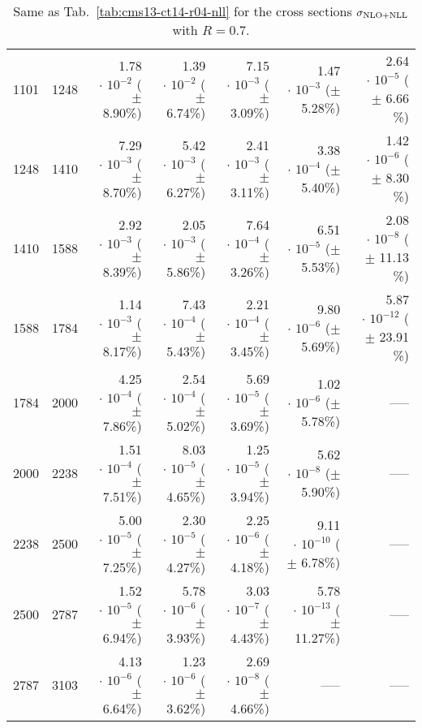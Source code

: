 \begin{table}[h!]
\begin{center}
\begin{tabular}{|r|r|r|r|r|r|r|}
1101 & 1248 & 1.78$\,\cdot\, 10^{-2}$  ($\pm\!\!$  8.90\%) & 1.39$\,\cdot\, 10^{-2}$  ($\pm\!\!$  6.74\%) & 7.15$\,\cdot\, 10^{-3}$  ($\pm\!\!$  3.09\%) & 1.47$\,\cdot\, 10^{-3}$  ($\pm\!\!$  5.28\%) & 2.64$\,\cdot\, 10^{-5}$  ($\pm\!\!$  6.66 \%)\\
1248 & 1410 & 7.29$\,\cdot\, 10^{-3}$  ($\pm\!\!$  8.70\%) & 5.42$\,\cdot\, 10^{-3}$  ($\pm\!\!$  6.27\%) & 2.41$\,\cdot\, 10^{-3}$  ($\pm\!\!$  3.11\%) & 3.38$\,\cdot\, 10^{-4}$  ($\pm\!\!$  5.40\%) & 1.42$\,\cdot\, 10^{-6}$  ($\pm\!\!$  8.30 \%)\\
1410 & 1588 & 2.92$\,\cdot\, 10^{-3}$  ($\pm\!\!$  8.39\%) & 2.05$\,\cdot\, 10^{-3}$  ($\pm\!\!$  5.86\%) & 7.64$\,\cdot\, 10^{-4}$  ($\pm\!\!$  3.26\%) & 6.51$\,\cdot\, 10^{-5}$  ($\pm\!\!$  5.53\%) & 2.08$\,\cdot\, 10^{-8}$  ($\pm\!\!$ 11.13 \%)\\
1588 & 1784 & 1.14$\,\cdot\, 10^{-3}$  ($\pm\!\!$  8.17\%) & 7.43$\,\cdot\, 10^{-4}$  ($\pm\!\!$  5.43\%) & 2.21$\,\cdot\, 10^{-4}$  ($\pm\!\!$  3.45\%) & 9.80$\,\cdot\, 10^{-6}$  ($\pm\!\!$  5.69\%) & 5.87$\,\cdot\, 10^{-12}$  ($\pm\!\!$ 23.91 \%)\\
1784 & 2000 & 4.25$\,\cdot\, 10^{-4}$  ($\pm\!\!$  7.86\%) & 2.54$\,\cdot\, 10^{-4}$  ($\pm\!\!$  5.02\%) & 5.69$\,\cdot\, 10^{-5}$  ($\pm\!\!$  3.69\%) & 1.02$\,\cdot\, 10^{-6}$  ($\pm\!\!$  5.78\%) & -----\\
2000 & 2238 & 1.51$\,\cdot\, 10^{-4}$  ($\pm\!\!$  7.51\%) & 8.03$\,\cdot\, 10^{-5}$  ($\pm\!\!$  4.65\%) & 1.25$\,\cdot\, 10^{-5}$  ($\pm\!\!$  3.94\%) & 5.62$\,\cdot\, 10^{-8}$  ($\pm\!\!$  5.90\%) & -----\\
2238 & 2500 & 5.00$\,\cdot\, 10^{-5}$  ($\pm\!\!$  7.25\%) & 2.30$\,\cdot\, 10^{-5}$  ($\pm\!\!$  4.27\%) & 2.25$\,\cdot\, 10^{-6}$  ($\pm\!\!$  4.18\%) & 9.11$\,\cdot\, 10^{-10}$  ($\pm\!\!$  6.78\%) & -----\\
2500 & 2787 & 1.52$\,\cdot\, 10^{-5}$  ($\pm\!\!$  6.94\%) & 5.78$\,\cdot\, 10^{-6}$  ($\pm\!\!$  3.93\%) & 3.03$\,\cdot\, 10^{-7}$  ($\pm\!\!$  4.43\%) & 5.78$\,\cdot\, 10^{-13}$  ($\pm\!\!$ 11.27\%) & -----\\
2787 & 3103 & 4.13$\,\cdot\, 10^{-6}$  ($\pm\!\!$  6.64\%) & 1.23$\,\cdot\, 10^{-6}$  ($\pm\!\!$  3.62\%) & 2.69$\,\cdot\, 10^{-8}$  ($\pm\!\!$  4.66\%) & ----- & -----\\
%
\hline
\end{tabular}
\caption{\label{tab:cms13-ct14-r07-nll}
  Same as Tab.~\ref{tab:cms13-ct14-r04-nll} for the cross sections
  $\sigma_{\rm NLO + NLL}$ with $R=0.7$.
}
\end{center}
\end{table}
